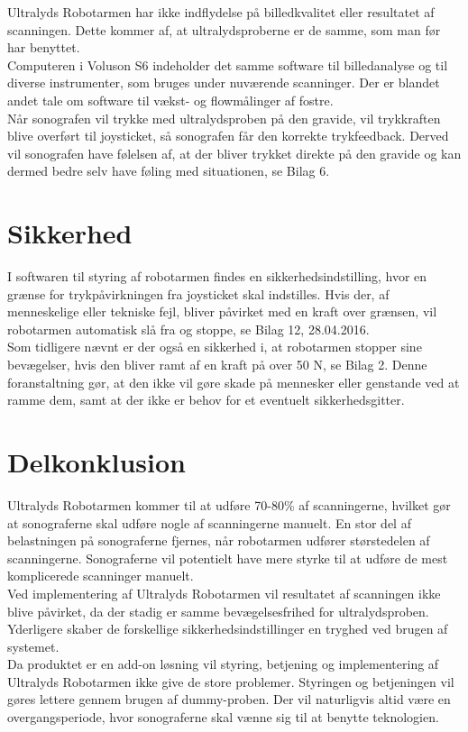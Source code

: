 Ultralyds Robotarmen har ikke indflydelse på billedkvalitet eller resultatet af scanningen. Dette kommer af, at ultralydsproberne er de samme, som man før har benyttet. \\
Computeren i Voluson S6 indeholder det samme software til billedanalyse og til diverse instrumenter, som bruges under nuværende scanninger. Der er blandet andet tale om software til vækst- og flowmålinger af fostre. \\
Når sonografen vil trykke med ultralydsproben på den gravide, vil trykkraften blive overført til joysticket, så sonografen får den korrekte trykfeedback. Derved vil sonografen have følelsen af, at der bliver trykket direkte på den gravide og kan dermed bedre selv have føling med situationen, se Bilag 6. 

\section{Sikkerhed}
I softwaren til styring af robotarmen findes en sikkerhedsindstilling, hvor en grænse for trykpåvirkningen fra joysticket skal indstilles. Hvis der, af menneskelige eller tekniske fejl, bliver påvirket med en kraft over grænsen, vil robotarmen automatisk slå fra og stoppe, se Bilag 12, 28.04.2016. \\
Som tidligere nævnt er der også en sikkerhed i, at robotarmen stopper sine bevægelser, hvis den bliver ramt af en kraft på over 50 N, se Bilag 2. Denne foranstaltning gør, at den ikke vil gøre skade på mennesker eller genstande ved at ramme dem, samt at der ikke er behov for et eventuelt sikkerhedsgitter. 

\section{Delkonklusion}
Ultralyds Robotarmen kommer til at udføre 70-80\% af scanningerne, hvilket gør at sonograferne skal udføre nogle af scanningerne manuelt. En stor del af belastningen på sonograferne fjernes, når robotarmen udfører størstedelen af scanningerne. Sonograferne vil potentielt have mere styrke til at udføre de mest komplicerede scanninger manuelt. \\
Ved implementering af Ultralyds Robotarmen vil resultatet af scanningen ikke blive påvirket, da der stadig er samme bevægelsesfrihed for ultralydsproben. Yderligere skaber de forskellige sikkerhedsindstillinger en tryghed ved brugen af systemet.\\ 
Da produktet er en add-on løsning vil styring, betjening og implementering af Ultralyds Robotarmen ikke give de store problemer. Styringen og betjeningen vil gøres lettere gennem brugen af dummy-proben.  
Der vil naturligvis altid være en overgangsperiode, hvor sonograferne skal vænne sig til at benytte teknologien. 


